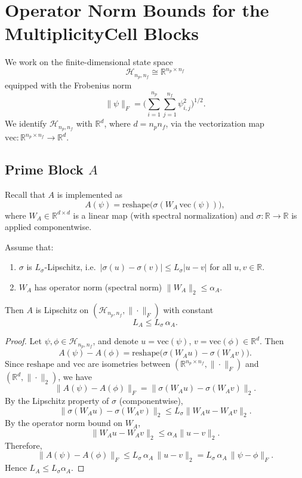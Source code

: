 \documentclass[11pt]{article}
\theoremstyle{definition}
\theoremstyle{plain}
\begin{document}
\section{Operator Norm Bounds for the MultiplicityCell Blocks}

We work on the finite-dimensional state space
\[
  \mathcal{H}_{n_p,n_f} \cong \mathbb{R}^{n_p \times n_f}
\]
equipped with the Frobenius norm
\[
  \|\psi\|_F = \biggl(\sum_{i=1}^{n_p}\sum_{j=1}^{n_f} \psi_{i,j}^2\biggr)^{1/2}.
\]
We identify $\mathcal{H}_{n_p,n_f}$ with $\mathbb{R}^{d}$, where $d = n_p n_f$, via the vectorization map $\mathrm{vec}: \mathbb{R}^{n_p \times n_f} \to \mathbb{R}^d$.

\subsection{Prime Block $A$}

Recall that $A$ is implemented as
\[
  A(\psi) = \mathrm{reshape}\bigl(\sigma(W_A\,\mathrm{vec}(\psi))\bigr),
\]
where $W_A \in \mathbb{R}^{d \times d}$ is a linear map (with spectral normalization) and $\sigma: \mathbb{R} \to \mathbb{R}$ is applied componentwise.

\begin{lemma}\label{lem:L_A}
Assume that:
\begin{enumerate}
  \item $\sigma$ is $L_\sigma$-Lipschitz, i.e.\ $|\sigma(u)-\sigma(v)| \le L_\sigma |u-v|$ for all $u,v \in \mathbb{R}$.
  \item $W_A$ has operator norm (spectral norm) $\|W_A\|_2 \le \alpha_A$.
\end{enumerate}
Then $A$ is Lipschitz on $(\mathcal{H}_{n_p,n_f},\|\cdot\|_F)$ with constant
\[
  L_A \le L_\sigma \,\alpha_A.
\]
\end{lemma}

\begin{proof}
Let $\psi,\phi \in \mathcal{H}_{n_p,n_f}$, and denote $u = \mathrm{vec}(\psi)$, $v = \mathrm{vec}(\phi) \in \mathbb{R}^d$.
Then
\[
  A(\psi) - A(\phi)
  = \mathrm{reshape}\bigl(\sigma(W_A u) - \sigma(W_A v)\bigr).
\]
Since $\mathrm{reshape}$ and $\mathrm{vec}$ are isometries between $(\mathbb{R}^{n_p \times n_f},\|\cdot\|_F)$ and $(\mathbb{R}^d,\|\cdot\|_2)$, we have
\[
  \|A(\psi) - A(\phi)\|_F = \|\sigma(W_A u) - \sigma(W_A v)\|_2.
\]
By the Lipschitz property of $\sigma$ (componentwise),
\[
  \|\sigma(W_A u) - \sigma(W_A v)\|_2 \le L_\sigma \|W_A u - W_A v\|_2.
\]
By the operator norm bound on $W_A$,
\[
  \|W_A u - W_A v\|_2 \le \alpha_A \|u - v\|_2.
\]
Therefore,
\[
  \|A(\psi) - A(\phi)\|_F \le L_\sigma \,\alpha_A\,\|u - v\|_2
  = L_\sigma \,\alpha_A \,\|\psi - \phi\|_F.
\]
Hence $L_A \le L_\sigma \alpha_A$.
\end{proof}
\end{document}
